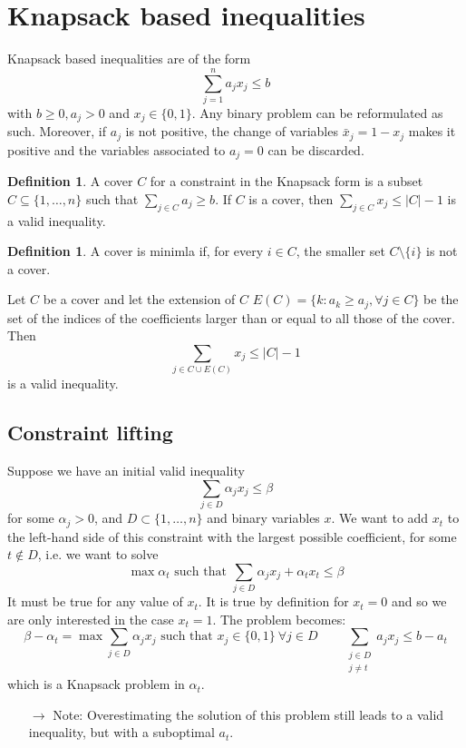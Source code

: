 \documentclass[11pt, openany]{report}
\theoremstyle{definition}
\newtheorem{definition}[thm]{Definition}
\begin{document}
\section{Knapsack based inequalities}
Knapsack based inequalities are of the form 
\begin{equation}
    \sum_{j=1}^n a_jx_j\le b
\end{equation}
with $b\ge0, a_j>0$ and $x_j\in \{0,1\}$. Any binary problem can be reformulated as such. Moreover, if $a_j$ is not positive, the change of variables $\bar x_j =1-x_j$ makes it positive and the variables associated to $a_j=0$ can be discarded. 
\begin{definition}
    A cover $C$ for a constraint in the Knapsack form is a subset $C\subseteq \{1,\dots,n\}$ such that $\sum_{j\in C}a_j\ge b$. If $C$ is a cover, then $\sum_{j\in C}x_j\le |C|-1$ is a valid inequality. 
\end{definition}
\begin{definition}
    A cover is minimla if, for every $i\in C$, the smaller set $C\setminus \{i\}$ is not a cover.
\end{definition}
Let $C$ be a cover and let the extension of $C$ $E(C) = \{k:a_k\ge a_j,\forall j\in C\}$ be the set of the indices of the coefficients larger than or equal to all those of the cover. Then
\begin{equation}
    \sum_{j\in C\cup E(C)} x_j\le |C|-1
\end{equation}
is a valid inequality. 
\subsection{Constraint lifting}
Suppose we have an initial valid inequality
\begin{equation}
    \sum_{j\in D}\alpha_jx_j \le \beta
\end{equation}
for some $\alpha_j>0$, and $D\subset \{1,\dots,n\}$ and binary variables $x$. We want to add $x_t$ to the left-hand side of this constraint with the largest possible coefficient, for some $t\not \in D$, i.e. we want to solve
\begin{equation}
    \max \alpha_t \text{ such that } \sum_{j\in D}\alpha_jx_j + \alpha_t x_t \le \beta 
\end{equation}
It must be true for any value of $x_t$. It is true by definition for $x_t=0$ and so we are only interested in the case $x_t=1$. The problem becomes:
\begin{equation}
    \beta -\alpha_t = \max \sum_{j\in D}\alpha_j x_j \text{ such that } x_j\in \{0,1\} \: \forall j\in D \qquad \sum_{\substack{j\in D\\j\neq t}} a_jx_j \le b-a_t
\end{equation}
which is a Knapsack problem in $\alpha_t$. 
\begin{itemize}
    \item [$\rightarrow$] Note: Overestimating the solution of this problem still leads to a valid inequality, but with a suboptimal $a_t$. 
\end{itemize}
\end{document}
